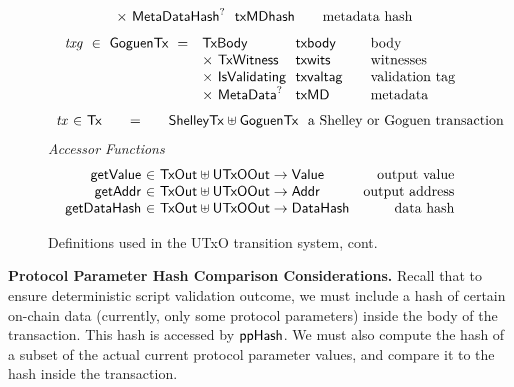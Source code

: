\begin{figure*}[htb]
\begin{equation*}
\begin{array}{r@{~~}l@{~~}l@{\qquad}l}
       & \times ~\MetaDataHash^? & \fun{txMDhash} & \text{metadata hash}\\
    \end{array}
  \end{equation*}
  \begin{equation*}
    \begin{array}{r@{~~}l@{~~}l@{\qquad}l}
      \var{txg} ~\in~ \GoguenTx ~=~
      & \TxBody & \fun{txbody} & \text{body}\\
      & \times ~\TxWitness & \fun{txwits} & \text{witnesses}\\
      & \times ~\IsValidating & \fun{txvaltag}&\text{validation tag}\\
      & \times ~\MetaData^? & \fun{txMD}&\text{metadata}\\
    \end{array}
  \end{equation*}
  \begin{equation*}
    \begin{array}{r@{~\in~}l@{\qquad=\qquad}lr}
      \var{tx} & \Tx & \ShelleyTx \uniondistinct \GoguenTx
      \text{~~a Shelley or Goguen transaction}\\
    \end{array}
  \end{equation*}
  \emph{Accessor Functions}
  \begin{equation*}
    \begin{array}{r@{~\in~}lr}
      \fun{getValue} & \TxOut \uniondistinct \UTxOOut \to \Value & \text{output value} \\
      \fun{getAddr} & \TxOut \uniondistinct \UTxOOut \to \Addr & \text{output address} \\
      \fun{getDataHash} & \TxOut \uniondistinct \UTxOOut \to \DataHash & \text{data hash}
    \end{array}
  \end{equation*}
  \caption{Definitions used in the UTxO transition system, cont.}
  \label{fig:defs:utxo-shelley-2}
\end{figure*}

\textbf{Protocol Parameter Hash Comparison Considerations.}
Recall that to ensure deterministic script validation outcome, we must include
a hash of certain on-chain data (currently, only some protocol parameters)
inside the body of the transaction. This hash is accessed by $\mathsf{ppHash}$.
We must also compute the hash of a subset of the actual current protocol parameter values,
and compare it to the hash inside the transaction.

